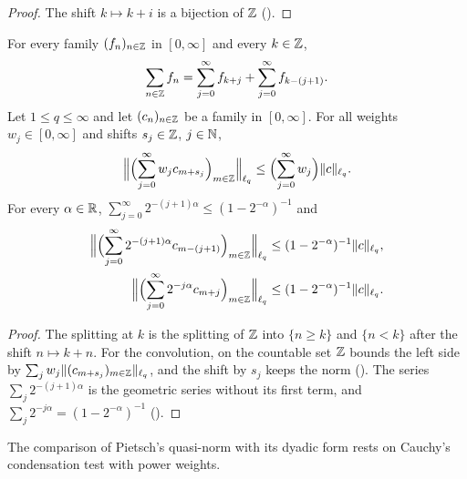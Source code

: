 \begin{proof}
\leanok
The shift $k \mapsto k + i$ is a bijection of $\mathbb{Z}$ ().
\end{proof}

\begin{lemma}
\label{lem:geometric-convolutions-integers}
\leanok
{}
For every family $(f_n)_{n \in \mathbb{Z}}$ in $[0, \infty]$ and every $k \in \mathbb{Z}$,
\[
  \sum_{n \in \mathbb{Z}} f_n = \sum_{j=0}^\infty f_{k+j} + \sum_{j=0}^\infty f_{k-(j+1)} .
\]
Let $1 \leq q \leq \infty$ and let $(c_n)_{n \in \mathbb{Z}}$ be a family in $[0, \infty]$. For all
weights $w_j \in [0, \infty]$ and shifts $s_j \in \mathbb{Z}$, $j \in \mathbb{N}$,
\[
  \Bigl\| \Bigl(\sum_{j=0}^\infty w_j c_{m + s_j}\Bigr)_{m \in \mathbb{Z}} \Bigr\|_{\ell_q}
  \leq \Bigl(\sum_{j=0}^\infty w_j\Bigr) \|c\|_{\ell_q} .
\]
For every $\alpha \in \mathbb{R}$, $\sum_{j=0}^\infty 2^{-(j+1)\alpha} \leq (1 - 2^{-\alpha})^{-1}$ and
\begin{align*}
  \Bigl\| \Bigl(\sum_{j=0}^\infty 2^{-(j+1)\alpha} c_{m-(j+1)}\Bigr)_{m \in \mathbb{Z}} \Bigr\|_{\ell_q}
  &\leq (1 - 2^{-\alpha})^{-1} \|c\|_{\ell_q} , \\
  \Bigl\| \Bigl(\sum_{j=0}^\infty 2^{-j\alpha} c_{m+j}\Bigr)_{m \in \mathbb{Z}} \Bigr\|_{\ell_q}
  &\leq (1 - 2^{-\alpha})^{-1} \|c\|_{\ell_q} .
\end{align*}
\end{lemma}

\begin{proof}
\leanok
The splitting at $k$ is the splitting of $\mathbb{Z}$ into $\{n \geq k\}$ and $\{n < k\}$ after the
shift $n \mapsto k + n$. For the convolution,  on the countable
set $\mathbb{Z}$ bounds the left side by
$\sum_j w_j \|(c_{m + s_j})_{m \in \mathbb{Z}}\|_{\ell_q}$, and the shift by $s_j$ keeps the norm
(). The series $\sum_j 2^{-(j+1)\alpha}$ is the geometric series
without its first term, and $\sum_j 2^{-j\alpha} = (1 - 2^{-\alpha})^{-1}$
().
\end{proof}

The comparison of Pietsch's quasi-norm with its dyadic form rests on Cauchy's condensation
test with power weights.

